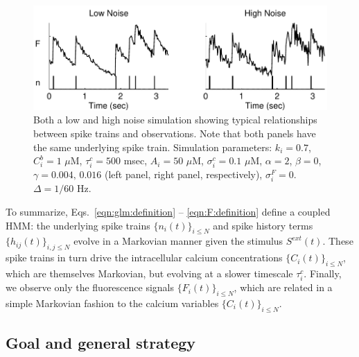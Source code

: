 \begin{figure}
\centering
\includegraphics[width=\hsize]{../figs/sim_examples}
\caption{Both a low and high noise simulation showing typical relationships between spike trains and observations. Note that both panels have the same underlying spike train. Simulation parameters: $k_i=0.7$, $C_i^b=1$ $\mu$M, $\tau^c_i=500$ msec, $A_i=50$ $\mu$M, $\sigma^c_i=0.1$ $\mu$M,  $\alpha=2$, $\beta=0$, $\gamma=0.004, \, 0.016$ (left panel, right panel, respectively), $\sigma^F_i=0$.  $\Delta=1/60$ Hz.}
\label{fig:example_traces}
\end{figure}

To summarize, Eqs.~\eqref{eqn:glm:definition} -- \eqref{eqn:F:definition} define a coupled HMM: the underlying spike trains $\{n_i(t)\}_{i\leq N}$ and spike history terms $\{h_{ij}(t)\}_{i,j\leq N}$ evolve in a Markovian manner given the stimulus $S^{ext}(t)$. These spike trains in turn drive the intracellular calcium concentrations $\{C_i(t)\}_{i\leq N}$, which are themselves Markovian, but evolving at a slower timescale $\tau_i^c$. Finally, we observe only the fluorescence signals $\{F_i(t)\}_{i\leq N}$, which are related in a simple Markovian fashion to the calcium variables $\{C_i(t)\}_{i\leq N}$.

\subsection{Goal and general strategy}  \label{sec:methods:goal}

